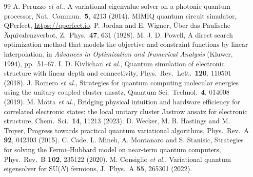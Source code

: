 \documentclass[11pt,a4paper]{article}
\begin{document}
\begin{thebibliography}{99}
\small
{} A. Peruzzo \emph{et al.}, A variational eigenvalue solver on a photonic
  quantum processor, Nat.\ Commun.\ \textbf{5}, 4213 (2014).
 MIMIQ quantum circuit simulator, QPerfect, \url{https://qperfect.io}.
 P. Jordan and E. Wigner, \"Uber das Paulische \"Aquivalenzverbot,
  Z.\ Phys.\ \textbf{47}, 631 (1928).
 M. J. D. Powell, A direct search optimization method that models the
  objective and constraint functions by linear interpolation, in \emph{Advances in
  Optimization and Numerical Analysis} (Kluwer, 1994), pp.\ 51--67.
 I. D. Kivlichan \emph{et al.}, Quantum simulation of electronic
  structure with linear depth and connectivity, Phys.\ Rev.\ Lett.\ \textbf{120}, 110501 (2018).
 J. Romero \emph{et al.}, Strategies for quantum computing molecular
  energies using the unitary coupled cluster ansatz, Quantum Sci.\ Technol.\ \textbf{4},
  014008 (2019).
 M. Motta \emph{et al.}, Bridging physical intuition and hardware
  efficiency for correlated electronic states: the local unitary cluster Jastrow ansatz
  for electronic structure, Chem.\ Sci.\ \textbf{14}, 11213 (2023).
 D. Wecker, M. B. Hastings and M. Troyer, Progress towards practical
  quantum variational algorithms, Phys.\ Rev.\ A \textbf{92}, 042303 (2015).
 C. Cade, L. Mineh, A. Montanaro and S. Stanisic, Strategies for solving
  the Fermi--Hubbard model on near-term quantum computers, Phys.\ Rev.\ B \textbf{102},
  235122 (2020).
 M. Consiglio \emph{et al.}, Variational quantum eigensolver for
  SU($N$) fermions, J.\ Phys.\ A \textbf{55}, 265301 (2022).
\end{thebibliography}
\end{document}

